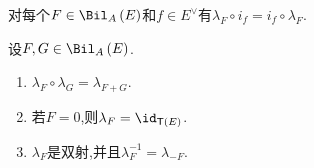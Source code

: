\begin{proposition}{}{}
	对每个$F\in\Bil_{A}\left(E\right)$和$f\in E^{\vee}$有$\lambda_{F}\circ i_{f}=i_{f}\circ\lambda_{F}$.
\end{proposition}

\begin{lemma}{}{}
	设$F,G\in\Bil_{A}\left(E\right)$.
	\begin{enumerate}
		\item $\lambda_{F}\circ\lambda_{G}=\lambda_{F+G}$.
		\item 若$F=0$,则$\lambda_{F}=\id_{\mathsf{T}\left(E\right)}$.
		\item $\lambda_{F}$是双射,并且$\lambda_{F}^{-1}=\lambda_{-F}$.
	\end{enumerate}
\end{lemma}












